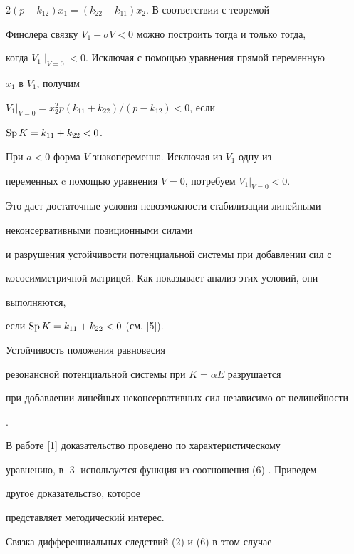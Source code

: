 \begin{exam}
$2(p-k_{12})x_{1}=(k_{22}-k_{11})x_{2}$. В соответствии с теоремой


Финслера связку $V_{1}-\sigma V<0$ можно построить тогда и только тогда,


когда $V_{1}\mid _{V=0}<0$. Исключая с помощью уравнения прямой переменную


$x_{1}$ в $V_{1}$, получим


$V_{1}|_{V=0}=x_{2}^{2}p(k_{11}+k_{22})/(p-k_{12})<0$, если


$\operatorname{Sp} K=k_{11}+k_{22}<0$.


При $a<0$ форма $V$ знакопеременна. Исключая из $V_{1}$ одну из


переменных c помощью уравнения $V=0$, потребуем $V_{1}|_{V=0}<0$.


Это даст достаточные условия невозможности стабилизации линейными


неконсервативными позиционными силами


и разрушения устойчивости потенциальной системы при добавлении сил с


кососимметричной матрицей. Как показывает анализ этих условий, они


выполняются,


если $\operatorname{Sp} K=k_{11}+k_{22}< 0$ (см. [5]).


\end{exam}





\begin{thm} Устойчивость положения равновесия


резонансной потенциальной системы при $K= \alpha E$ разрушается


при добавлении линейных неконсервативных сил независимо от нелинейности


\cite{Mer}.


\end{thm}





В работе [1] доказательство проведено по характеристическому


уравнению, в [3] используется функция из соотношения (6) . Приведем


другое доказательство, которое


представляет методический интерес.





Связка дифференциальных следствий (2) и (6) в этом случае


